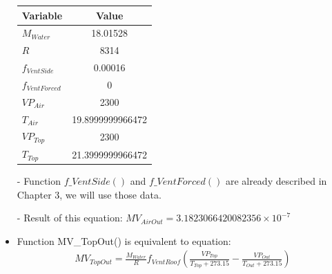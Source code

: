 \documentclass[a4paper]{article}
\numberwithin{equation}{section}
\begin{document}
\begin{itemize}
        \begin{table}[H]
          \centering
          \begin{tabular}{@{}lS[table-format=4.13]@{}}
            \toprule
            \textbf{Variable}  & \textbf{Value}   \\
            \midrule
            \(M_{Water}\)      & 18.01528         \\
            \(R\)              & 8314             \\
            \(f_{VentSide}\)   & 0.00016          \\
            \(f_{VentForced}\) & 0                \\
            \(VP_{Air}\)       & 2300             \\
            \(T_{Air}\)        & 19.8999999966472 \\
            \(VP_{Top}\)       & 2300             \\
            \(T_{Top}\)        & 21.3999999966472 \\
            \bottomrule
          \end{tabular}
        \end{table}
  \item [-] Function \hyperref[fVentSide]{\underline{\(f\_VentSide()\)}} and \hyperref[fVentForced]{\underline{\(f\_VentForced()\)}} are already described in Chapter 3, we will use those data.
  \item[-] Result of this equation: \(MV_{AirOut} = 3.1823066420082356 \times 10^{-7} \)

  \item Function MV\_TopOut() is equivalent to equation:
        \begin{align*}
          MV_{TopOut}  = \frac{M_{Water}}{R} f_{VentRoof} (\frac{VP_{Top}}{T_{Top} + 273.15} - \frac{VP_{Out}}{T_{Out} + 273.15})
        \end{align*}


\end{itemize}
\end{document}
